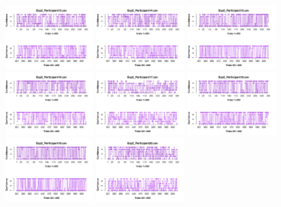 \begin{figure}[th]
\includegraphics[width=0.30\textwidth]{Figures/Rating_Exp2_P13} \includegraphics[width=0.30\textwidth]{Figures/Rating_Exp2_P14} \includegraphics[width=0.30\textwidth]{Figures/Rating_Exp2_P15}
\includegraphics[width=0.30\textwidth]{Figures/Rating_Exp2_P16} \includegraphics[width=0.30\textwidth]{Figures/Rating_Exp2_P17} \includegraphics[width=0.30\textwidth]{Figures/Rating_Exp2_P18}
\includegraphics[width=0.30\textwidth]{Figures/Rating_Exp2_P19} \includegraphics[width=0.30\textwidth]{Figures/Rating_Exp2_P20} 

\end{figure}
